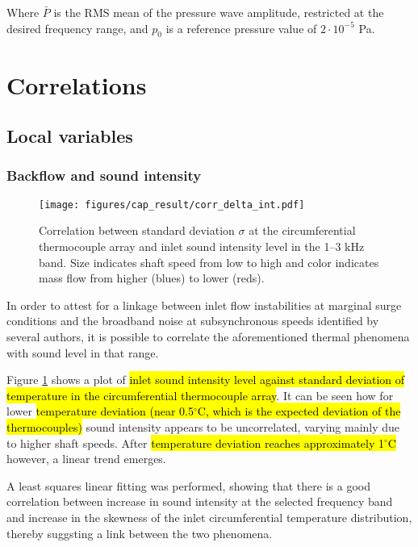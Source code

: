 Where $\bar P$ is the RMS mean of the pressure wave amplitude, restricted at the desired frequency range, and $p_0$ is a reference pressure value of $2\cdot 10^{-5}$ Pa.

\section{Correlations}
\label{sec:correlations}

\subsection{Local variables}
\subsubsection{Backflow and sound intensity}

\begin{figure}[htb!]
\centering
\texttt{[image: figures/cap\_result/corr\_delta\_int.pdf]}
\caption{Correlation between standard deviation $\sigma$ at the circumferential thermocouple array and inlet sound intensity level in the 1--3 kHz band. Size indicates shaft speed from low to high and color indicates mass flow from higher (blues) to lower (reds).}
\label{fig:corr1}
\end{figure}

In order to attest for a linkage between inlet flow instabilities at marginal surge conditions and the broadband noise at subsynchronous speeds identified by several authors, it is possible to correlate the aforementioned thermal phenomena with sound level in that range.

Figure \ref{fig:corr1} shows a plot of \hl{inlet sound intensity level against standard deviation of temperature in the circumferential thermocouple array}. It can be seen how for lower \hl{temperature deviation (near 0.5$^{\circ}$C, which is the expected deviation of the thermocouples)} sound intensity appears to be uncorrelated, varying mainly due to higher shaft speeds. After \hl{temperature deviation reaches approximately 1$^{\circ}$C} however, a linear trend emerges. 

A least squares linear fitting was performed, showing that there is a good correlation between increase in sound intensity at the selected frequency band and increase in the skewness of the inlet circumferential temperature distribution, thereby suggsting a link between the two phenomena.

